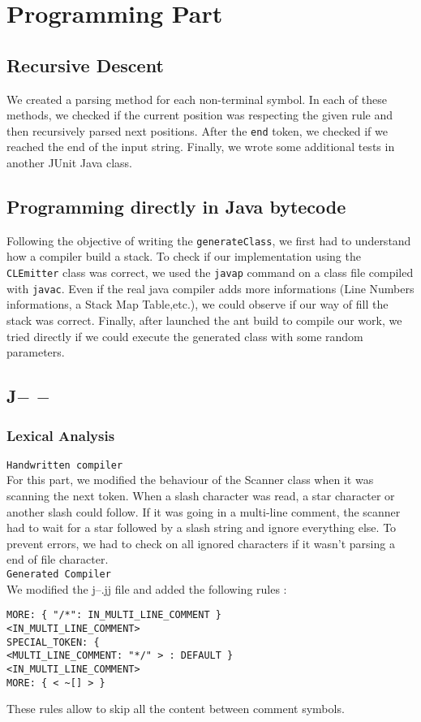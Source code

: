 \section{Programming Part}
\subsection{Recursive Descent}
We created a parsing method for each non-terminal symbol. In each of these methods, we checked if the current position was respecting the given rule and then recursively parsed next positions. After the \texttt{end} token, we checked if we reached the end of the input string. Finally, we wrote some additional tests in another JUnit Java class.

\subsection{Programming directly in Java bytecode}
Following the objective of writing the \texttt{generateClass}, we first had to understand how a compiler build a stack. To check if our implementation using the \texttt{CLEmitter} class was correct, we used the \texttt{javap} command on a class file compiled with \texttt{javac}. Even if the real java compiler adds more informations (Line Numbers informations, a Stack Map Table,etc.), we could observe if our way of fill the stack was correct. Finally, after launched the ant build to compile our work, we tried directly if we could execute the generated class with some random parameters. 

\subsection{J$-$ $-$}
\subsubsection{Lexical Analysis}
\texttt{Handwritten compiler} \\
For this part, we modified the behaviour of the Scanner class when it was scanning the next token. When a slash character was read, a star character or another slash could follow. If it was going in a multi-line comment, the scanner had to wait for a star followed by a slash string and ignore everything else. To prevent errors, we had to check on all ignored characters if it wasn't parsing a end of file character.\\

\texttt{Generated Compiler} \\
We modified the j--.jj file and added the following rules :
\begin{verbatim}
MORE: { "/*": IN_MULTI_LINE_COMMENT } 
<IN_MULTI_LINE_COMMENT> 
SPECIAL_TOKEN: { 
<MULTI_LINE_COMMENT: "*/" > : DEFAULT } 
<IN_MULTI_LINE_COMMENT> 
MORE: { < ~[] > }
\end{verbatim}
These rules allow to skip all the content between comment symbols.

